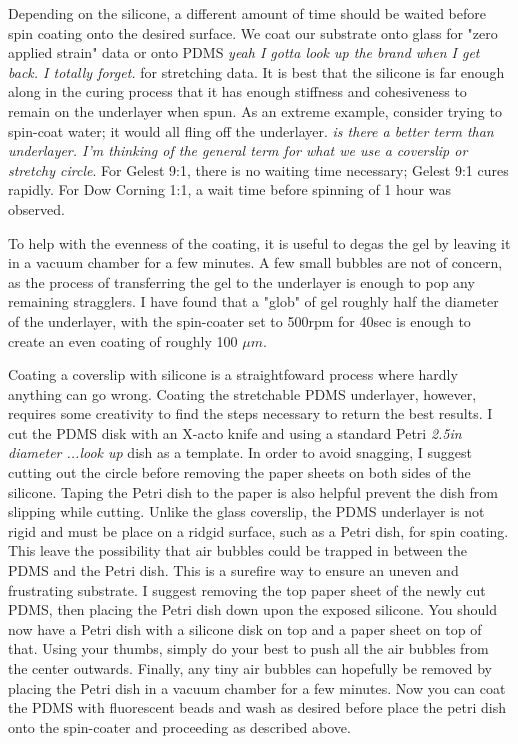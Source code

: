 Depending on the silicone, a different amount of time should be waited before spin coating onto the desired surface. We coat our substrate onto glass for "zero applied strain" data or onto PDMS \emph{yeah I gotta look up the brand when I get back. I totally forget.} for stretching data. It is best that the silicone is far enough along in the curing process that it has enough stiffness and cohesiveness to remain on the underlayer when spun. As an extreme example, consider trying to spin-coat water; it would all fling off the underlayer. \emph{is there a better term than underlayer. I'm thinking of the general term for what we use a coverslip or stretchy circle}. For Gelest 9:1, there is no waiting time necessary; Gelest 9:1 cures rapidly. For Dow Corning 1:1, a wait time before spinning of 1 hour was observed. 

To help with the evenness of the coating, it is useful to degas the gel by leaving it in a vacuum chamber for a few minutes. A few small bubbles are not of concern, as the process of transferring the gel to the underlayer is enough to pop any remaining stragglers. I have found that a "glob" of gel roughly half the diameter of the underlayer, with the spin-coater set to 500rpm for 40sec is enough to create an even coating of roughly 100 $\mu m$.  

Coating a coverslip with silicone is a straightfoward process where hardly anything can go wrong. Coating the stretchable PDMS underlayer, however, requires some creativity to find the steps necessary to return the best results. I cut the PDMS disk with an X-acto knife and using a standard Petri \emph{2.5in diameter ...look up} dish as a template. In order to avoid snagging, I suggest cutting out the circle before removing the paper sheets on both sides of the silicone. Taping the Petri dish to the paper is also helpful prevent the dish from slipping while cutting. Unlike the glass coverslip, the PDMS underlayer is not rigid and must be place on a ridgid surface, such as a Petri dish, for spin coating. This leave the possibility that air bubbles could be trapped in between the PDMS and the Petri dish. This is a surefire way to ensure an uneven and frustrating substrate. I suggest removing the top paper sheet of the newly cut PDMS, then placing the Petri dish down upon the exposed silicone. You should now have a Petri dish with a silicone disk on top and a paper sheet on top of that. Using your thumbs, simply do your best to push all the air bubbles from the center outwards. Finally, any tiny air bubbles can hopefully be removed by placing the Petri dish in a vacuum chamber for a few minutes. Now you can coat the PDMS with fluorescent beads and wash as desired before place the petri dish onto the spin-coater and proceeding as described above.

